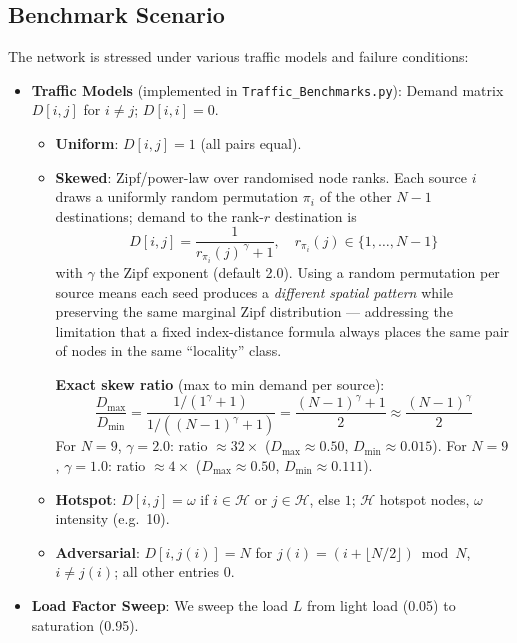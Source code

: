 \documentclass{article}
\begin{document}
    \subsection{Benchmark Scenario}
    The network is stressed under various traffic models and failure conditions:
    \begin{itemize}
        \item \textbf{Traffic Models} (implemented in \texttt{Traffic\_Benchmarks.py}): Demand matrix $D[i,j]$ for $i \neq j$; $D[i,i]=0$.
            \begin{itemize}
                \item \textbf{Uniform}: $D[i,j] = 1$ (all pairs equal).
                \item \textbf{Skewed}: Zipf/power-law over randomised node ranks.  Each source $i$ draws a uniformly random permutation $\pi_i$ of the other $N{-}1$ destinations; demand to the rank-$r$ destination is
                \[
                    D[i,j] = \frac{1}{r_{\pi_i}(j)^{\,\gamma} + 1}, \quad r_{\pi_i}(j) \in \{1,\ldots,N{-}1\}
                \]
                with $\gamma$ the Zipf exponent (default 2.0).  Using a random permutation per source means each seed produces a \emph{different spatial pattern} while preserving the same marginal Zipf distribution — addressing the limitation that a fixed index-distance formula always places the same pair of nodes in the same ``locality'' class.

                \textbf{Exact skew ratio} (max to min demand per source):
                \[
                    \frac{D_{\max}}{D_{\min}} = \frac{1/(1^\gamma+1)}{1/((N{-}1)^\gamma+1)} = \frac{(N{-}1)^\gamma+1}{2} \approx \frac{(N{-}1)^\gamma}{2}
                \]
                For $N=9$, $\gamma=2.0$: ratio $\approx 32\times$ ($D_{\max}\approx0.50$, $D_{\min}\approx0.015$).
                For $N=9$, $\gamma=1.0$: ratio $\approx 4\times$ ($D_{\max}\approx0.50$, $D_{\min}\approx0.111$).
                \item \textbf{Hotspot}: $D[i,j] = \omega$ if $i \in \mathcal{H}$ or $j \in \mathcal{H}$, else $1$; $\mathcal{H}$ hotspot nodes, $\omega$ intensity (e.g.\ 10).
                \item \textbf{Adversarial}: $D[i, j(i)] = N$ for $j(i) = (i + \lfloor N/2 \rfloor) \bmod N$, $i \neq j(i)$; all other entries $0$.
            \end{itemize}
        \item \textbf{Load Factor Sweep}: We sweep the load $L$ from light load (0.05) to saturation (0.95).
    \end{itemize}
\end{document}
